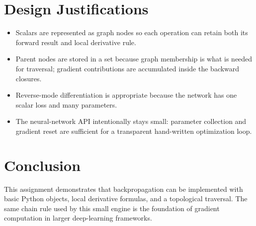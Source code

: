 \documentclass[11pt,a4paper]{article}
\begin{document}
\section{Design Justifications}
\begin{itemize}
  \item Scalars are represented as graph nodes so each operation can retain
        both its forward result and local derivative rule.
  \item Parent nodes are stored in a set because graph membership is what is
        needed for traversal; gradient contributions are accumulated inside
        the backward closures.
  \item Reverse-mode differentiation is appropriate because the network has
        one scalar loss and many parameters.
  \item The neural-network API intentionally stays small: parameter
        collection and gradient reset are sufficient for a transparent
        hand-written optimization loop.
\end{itemize}

\section{Conclusion}
This assignment demonstrates that backpropagation can be implemented with
basic Python objects, local derivative formulas, and a topological traversal.
The same chain rule used by this small engine is the foundation of gradient
computation in larger deep-learning frameworks.
\end{document}
